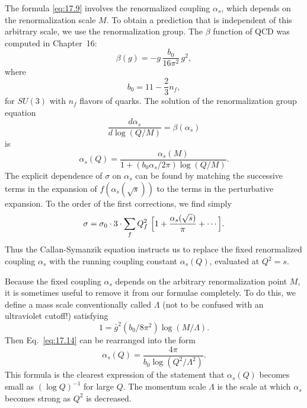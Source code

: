 The formula \eqref{eq:17.9} involves the renormalized coupling $\alpha_s$,
which depends on the renormalization scale $M$.  To obtain a prediction that
is independent of this arbitrary scale, we use the renormalization group.
The $\beta$ function of QCD was computed in Chapter~16:
\begin{equation}
  \beta(g) = -g\,\frac{b_0}{16\pi^2}\,g^2 ,
  \label{eq:17.11}
\end{equation}
where
\begin{equation}
  b_0 = 11 - \frac{2}{3}n_f ,
  \label{eq:17.12}
\end{equation}
for $SU(3)$ with $n_f$ flavors of quarks.  The solution of the renormalization
group equation
\begin{equation}
  \frac{d\alpha_s}{d\log(Q/M)} = \beta(\alpha_s)
\end{equation}
is
\begin{equation}
  \alpha_s(Q) = \frac{\alpha_s(M)}{1 + (b_0\alpha_s/2\pi)\log(Q/M)} .
  \label{eq:17.14}
\end{equation}
The explicit dependence of $\sigma$ on $\alpha_s$ can be found by matching the
successive terms in the expansion of $f(\alpha_s(\sqrt{s}))$ to the terms in
the perturbative expansion.  To the order of the first corrections, we find
simply
\begin{equation}
  \sigma = \sigma_0\cdot 3\cdot \sum_f Q_f^2\ \Bigl[ 1 + \frac{\alpha_s
    (\sqrt{s})}{\pi} + \cdots \Bigr] .
  \label{eq:17.15}
\end{equation}
Thus the Callan-Symanzik equation instructs us to replace the fixed
renormalized coupling $\alpha_s$ with the running coupling constant
$\alpha_s(Q)$, evaluated at $Q^2 = s$.

Because the fixed coupling $\alpha_s$ depends on the arbitrary renormalization
point $M$, it is sometimes useful to remove it from our formulae completely.
To do this, we define a mass scale conventionally called $\Lambda$ (not to be
confused with an ultraviolet cutoff!) satisfying
\begin{equation}
  1 = \bar{g}^2(b_0/8\pi^2)\log(M/\Lambda) .
  \label{eq:17.16}
\end{equation}
Then Eq.~\eqref{eq:17.14} can be rearranged into the form
\begin{equation}
  \alpha_s(Q) = \frac{4\pi}{b_0\log(Q^2/\Lambda^2)} .
  \label{eq:17.17}
\end{equation}
This formula is the clearest expression of the statement that $\alpha_s(Q)$
becomes small as $(\log Q)^{-1}$ for large $Q$.  The momentum scale $\Lambda$
is the scale at which $\alpha_s$ becomes strong as $Q^2$ is decreased.

